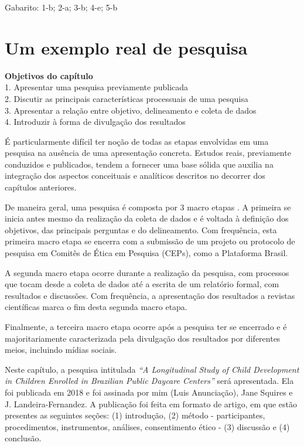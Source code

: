 \documentclass[
]{book}
\newenvironment{objectives}{
  \definecolor{shadecolor}{rgb}{0, 0, 0}  %
  \color{white}
  \begin{shaded}}
 {\end{shaded}}
\begin{document}
Gabarito: 1-b; 2-a; 3-b; 4-e; 5-b

\hypertarget{um-exemplo-real-de-pesquisa}{%
\chapter{Um exemplo real de pesquisa}\label{um-exemplo-real-de-pesquisa}}

\begin{objectives}

\textbf{Objetivos do capítulo}\\
1. Apresentar uma pesquisa previamente publicada\\
2. Discutir as principais características processuais de uma pesquisa\\
3. Apresentar a relação entre objetivo, delineamento e coleta de dados\\
4. Introduzir à forma de divulgação dos resultados

\end{objectives}

É particularmente difícil ter noção de todas as etapas envolvidas em uma pesquisa na ausência de uma apresentação concreta. Estudos reais, previamente conduzidos e publicados, tendem a fornecer uma base sólida que auxilia na integração dos aspectos conceituais e analíticos descritos no decorrer dos capítulos anteriores.

De maneira geral, uma pesquisa é composta por 3 macro etapas \citep{Mayer2007}. A primeira se inicia antes mesmo da realização da coleta de dados e é voltada à definição dos objetivos, das principais perguntas e do delineamento. Com frequência, esta primeira macro etapa se encerra com a submissão de um projeto ou protocolo de pesquisa em Comitês de Ética em Pesquisa (CEPs), como a Plataforma Brasil.

A segunda macro etapa ocorre durante a realização da pesquisa, com processos que tocam desde a coleta de dados até a escrita de um relatório formal, com resultados e discussões. Com frequência, a apresentação dos resultados a revistas científicas marca o fim desta segunda macro etapa.

Finalmente, a terceira macro etapa ocorre após a pesquisa ter se encerrado e é majoritariamente caracterizada pela divulgação dos resultados por diferentes meios, incluindo mídias sociais.

Neste capítulo, a pesquisa intitulada \emph{``A Longitudinal Study of Child Development in Children Enrolled in Brazilian Public Daycare Centers''} será apresentada. Ela foi publicada em 2018 e foi assinada por mim (Luis Anunciação), Jane Squires e J. Landeira-Fernandez. A publicação foi feita em formato de artigo, em que estão presentes as seguintes seções: (1) introdução, (2) método - participantes, procedimentos, instrumentos, análises, consentimento ético - (3) discussão e (4) conclusão.
\end{document}
